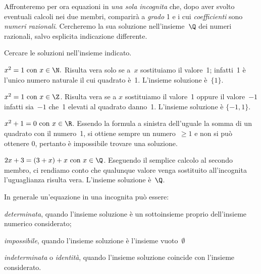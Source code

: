 Affronteremo per ora equazioni in
\emph{una sola incognita} che, dopo aver svolto eventuali calcoli nei due 
membri, comparirà a
\emph{grado} 1 e i cui \emph{coefficienti} sono \emph{numeri razionali}.
Cercheremo la sua soluzione
nell'insieme~\(\Q\) dei numeri razionali, salvo esplicita indicazione 
differente.
 \begin{esempio}
Cercare le soluzioni nell'insieme indicato.
 \begin{enumeratea}
 \item \(x^{2}=1 \text{ con }x\in\N.\)
Risulta vera solo se a~\(x\) sostituiamo il valore~1; infatti~1 è
l'unico numero naturale il cui quadrato è~1.
L'insieme soluzione è~\(\{1\}\).
 \item \(x^{2}=1 \text{ con }x\in\Z\).
Risulta vera se a
\(x\) sostituiamo il valore~1 oppure il valore~\(-1\) infatti sia~\(-1\) che~1
elevati al quadrato danno~1. L'insieme soluzione è
\(\{-1, 1\}\).
 \item \(x^{2}+1=0\text{ con }x\in\R\).
Essendo la formula a sinistra
dell'uguale la somma di un quadrato con il numero~1, si ottiene sempre
un numero~\(\geq1\) e non si può ottenere \(0\), pertanto è impossibile 
trovare 
una 
soluzione.
 \item \(2x+3=(3+x)+x \text{ con } x\in\Q\).
Eseguendo il semplice calcolo al secondo
membro, ci rendiamo conto che qualunque valore venga sostituito
all'incognita l'uguaglianza risulta
vera. L'insieme soluzione è~\(\Q\).
\end{enumeratea}
 \end{esempio}

In generale un'equazione in una incognita può essere:

\begin{enumeratea}
\item \emph{determinata}, quando l'insieme soluzione è un sottoinsieme proprio
dell'insieme numerico considerato;
\item \emph{impossibile}, quando l'insieme soluzione è l'insieme 
vuoto~\(\emptyset\)
\item \emph{indeterminata} o \emph{identità}, quando l'insieme soluzione 
coincide con
l'insieme considerato.
\end{enumeratea}

